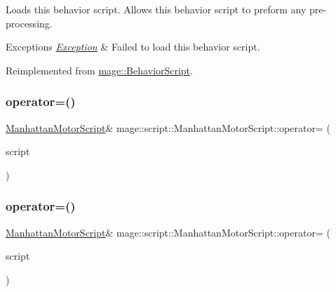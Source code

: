 Loads this behavior script. Allows this behavior script to preform any pre-\/processing.


\begin{DoxyExceptions}{Exceptions}
{\em \hyperlink{classmage_1_1_exception}{Exception}} & Failed to load this behavior script. \\
\hline
\end{DoxyExceptions}


Reimplemented from \hyperlink{classmage_1_1_behavior_script_a06521eef472f2d878a9f652b95b723a8}{mage\+::\+Behavior\+Script}.

\hypertarget{classmage_1_1script_1_1_manhattan_motor_script_a7a6280230faa4d42a141e1d7768bcd0d}{}\label{classmage_1_1script_1_1_manhattan_motor_script_a7a6280230faa4d42a141e1d7768bcd0d} 
\subsubsection{\texorpdfstring{operator=()}{operator=()}\hspace{0.1cm}{\footnotesize\ttfamily [1/2]}}
{\footnotesize\ttfamily \hyperlink{classmage_1_1script_1_1_manhattan_motor_script}{Manhattan\+Motor\+Script}\& mage\+::script\+::\+Manhattan\+Motor\+Script\+::operator= (\begin{DoxyParamCaption}\item[{const \hyperlink{classmage_1_1script_1_1_manhattan_motor_script}{Manhattan\+Motor\+Script} \&}]{script }\end{DoxyParamCaption})\hspace{0.3cm}{\ttfamily [delete]}}

\hypertarget{classmage_1_1script_1_1_manhattan_motor_script_a2b185979a64b35d9f9d6f4027724560a}{}\label{classmage_1_1script_1_1_manhattan_motor_script_a2b185979a64b35d9f9d6f4027724560a} 
\subsubsection{\texorpdfstring{operator=()}{operator=()}\hspace{0.1cm}{\footnotesize\ttfamily [2/2]}}
{\footnotesize\ttfamily \hyperlink{classmage_1_1script_1_1_manhattan_motor_script}{Manhattan\+Motor\+Script}\& mage\+::script\+::\+Manhattan\+Motor\+Script\+::operator= (\begin{DoxyParamCaption}\item[{\hyperlink{classmage_1_1script_1_1_manhattan_motor_script}{Manhattan\+Motor\+Script} \&\&}]{script }\end{DoxyParamCaption})\hspace{0.3cm}{\ttfamily [delete]}}


